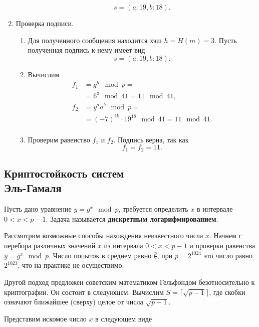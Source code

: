 \begin{enumerate}
\begin{enumerate}
                \[ s = (a:19, b:18). \]
        \end{enumerate}
    \item Проверка подписи.
        \begin{enumerate}
            \item Для полученного сообщения находится хэш $h = H(m) = 3$. Пусть полученная подпись к нему имеет вид
                \[ s = (a:19, b:18). \]
            \item Вычислим
                \[ \begin{array}{ll}
                    f_1 & = g^h \mod p = \\
                        & = 6^3 \mod 41 = 11 \mod 41, \\
                    f_2 & = y^a a^b \mod p = \\
                        & = (-7)^{19} \cdot 19^{18} \mod 41 = 11 \mod 41. \\
                \end{array} \]
            \item Проверим равенство $f_1$ и $f_2$. Подпись верна, так как
                \[ f_1 = f_2 = 11. \]
        \end{enumerate}
\end{enumerate}


\subsection[Криптостойкость]{Криптостойкость систем \protect\\ Эль-Гамаля}

Пусть дано уравнение $y=g^{x} \mod p$, требуется определить $x$ в интервале $0<x<p-1$. Задача называется \textbf{дискретным логарифмированием}.

Рассмотрим возможные способы нахождения неизвестного числа $x$. Начнем с перебора различных значений $x$ из интервала $0<x<p-1$ и проверки равенства $y=g^{x} \mod p$. Число попыток в среднем равно $\frac{p}{2}$, при $p=2^{1024}$ это число равно $2^{1023}$, что на практике не осуществимо.

Другой подход предложен советским математиком Гельфондом безотносительно к криптографии. Он состоит в следующем.
Вычислим $S=\lceil\sqrt{p-1}\rceil $, где скобки означают ближайшее (сверху) целое от числа $\sqrt{p-1} $.

Представим искомое число $x$   в следующем виде

